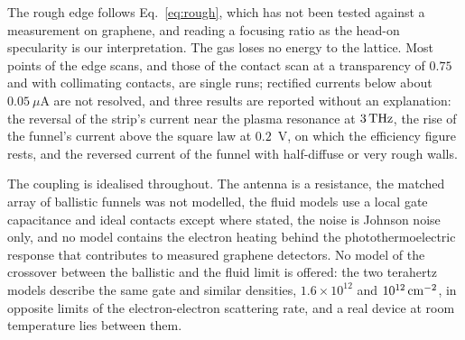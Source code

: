 \begin{enumerate}
The rough edge follows Eq.~\eqref{eq:rough}, which has not been tested
against a measurement on graphene, and reading a focusing ratio as the
head-on specularity is our interpretation. The gas loses no energy to the
lattice. Most points of the edge scans, and those of the contact scan
at a transparency of $0.75$ and with collimating contacts, are single
runs; rectified currents below about $0.05\ \mu$A are not resolved, and three
results are reported without an explanation: the reversal of the strip's
current near the plasma resonance at $3\,\mathrm{THz}$, the rise of the funnel's
current above the square law at $0.2$~V, on which the efficiency figure
rests, and the reversed current of the funnel with half-diffuse or very
rough walls.
\end{enumerate}

The coupling is idealised throughout. The antenna is a resistance, the
matched array of ballistic funnels was not modelled, the fluid models use
a local gate capacitance and ideal contacts except where stated, the
noise is Johnson noise only, and no model contains the electron heating
behind the photothermoelectric response that contributes to measured
graphene detectors. No model of the crossover between the ballistic and
the fluid limit is offered: the two terahertz models describe the same
gate and similar densities, $1.6\times10^{12}$ and $10^{12}\,\mathrm{cm^{-2}}$, in
opposite limits of the electron-electron scattering rate, and a real
device at room temperature lies between them.
